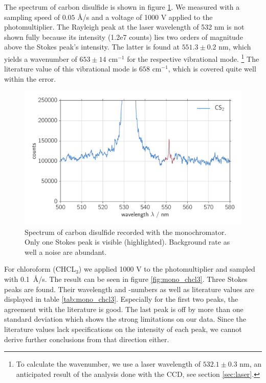 The spectrum of carbon disulfide is shown in figure \ref{fig:mono_cs2}. We measured with a sampling speed of 
$0.05$ \AA/s and a voltage of 1000 V applied to the photomultiplier. 
The Rayleigh peak at the laser wavelength of 532 nm is not shown fully because its intensity (1.2e7 counts) 
lies two orders of magnitude above the Stokes peak's intensity.
The latter is found at $551.3 \pm 0.2$ nm, which yields a wavenumber of $653 \pm 14 \text{ cm}^{-1}$ for the respective
vibrational mode.%
\footnote{
    To calculate the wavenumber, we use a laser wavelength of $532.1 \pm 0.3$ nm, an anticipated result of the analysis
    done with the CCD, see section \ref{sec:laser}.
} The literature value of this vibrational mode is $658 \text{ cm}^{-1}$, which is covered quite well within the error.   

\begin{figure}[htpb]
    \centering
    \includegraphics[width=0.8\linewidth]{analysis/figures/mono_cs2}
    \caption{Spectrum of carbon disulfide recorded with the monochromator. Only one Stokes peak is visible (highlighted).
    Background rate as well a noise are abundant. }
    \label{fig:mono_cs2}
\end{figure}


For chloroform (CHCL$_3$) we applied 1000 V to the photomultiplier and sampled with 0.1~\AA/s. The result can be seen in 
figure \ref{fig:mono_chcl3}. Three Stokes peaks are found. Their wavelength and -numbers as well as literature values are 
displayed in table \ref{tab:mono_chcl3}. Especially for the first two peaks, the agreement with the literature is good. 
The last peak is off by more than one standard deviation which shows the strong limitations on our data. Since the 
literature values lack specifications on the intensity of each peak, we cannot derive further conclusions from that
direction either. 

